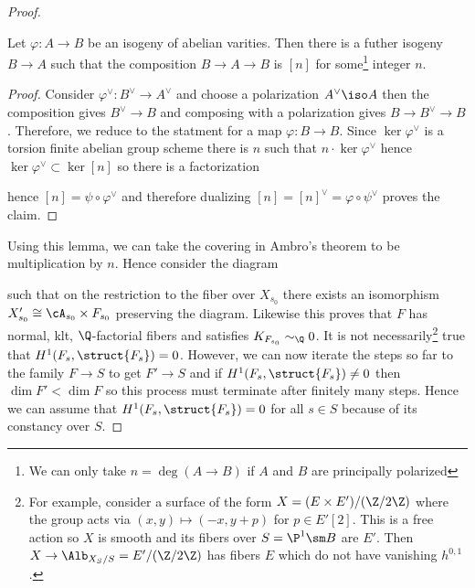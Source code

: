 \documentclass[12pt]{article}
\begin{document}
\begin{proof}
\begin{lemma}
Let $\varphi : A \to B$ be an isogeny of abelian varities. Then there is a futher isogeny $B \to A$ such that the composition $B \to A \to B$ is $[n]$ for some\footnote{We can only take $n = \deg{(A \to B)}$ if $A$ and $B$ are principally polarized} integer $n$.
\end{lemma}

\begin{proof}
Consider $\varphi^{\vee} : B^\vee \to A^{\vee}$ and choose a polarization $A^{\vee} \iso A$ then the composition gives $B^\vee \to B$ and composing with a polarization gives $B \to B^\vee \to B$. Therefore, we reduce to the statment for a map $\varphi : B \to B$. Since $\ker{\varphi^{\vee}}$ is a torsion finite abelian group scheme there is $n$ such that $n \cdot \ker{\varphi^{\vee}}$ hence $\ker{\varphi^{\vee}} \subset \ker{[n]}$ so there is a factorization
\begin{center}
\end{center}
hence $[n] = \psi \circ \varphi^\vee$ and therefore dualizing $[n] = [n]^\vee = \varphi \circ \psi^\vee$ proves the claim.
\end{proof}

Using this lemma, we can take the covering in Ambro's theorem to be multiplication by $n$. Hence consider the diagram
\begin{center}
\end{center}
such that on the restriction to the fiber over $X_{s_0}$ there exists an isomorphism $X'_{s_0} \cong \cA_{s_0} \times F_{s_0}$ preserving the diagram. Likewise this proves that $F$ has normal, klt, $\Q$-factorial fibers and satisfies $K_{F_{s_0}} \sim_{\Q} 0$. It is not necessarily\footnote{For example, consider a surface of the form $X = (E \times E')/(\Z / 2 \Z)$ where the group acts via $(x,y) \mapsto (-x, y + p)$ for $p \in E'[2]$. This is a free action so $X$ is smooth and its fibers over $S = \P^1 \sm B$ are $E'$. Then $X \to \Alb_{X_S/S} = E' / (\Z / 2 \Z)$ has fibers $E$ which do not have vanishing $h^{0,1}$.} true that $H^1(F_s, \struct{F_s}) = 0$. However, we can now iterate the steps so far to the family $F \to S$ to get $F' \to S$ and if $H^1(F_s, \struct{F_s}) \neq 0$ then $\dim{F'} < \dim{F}$ so this process must terminate after finitely many steps. Hence we can assume that $H^1(F_s, \struct{F_s}) = 0$ for all $s \in S$ because of its constancy over $S$.


\end{proof}
\end{document}
